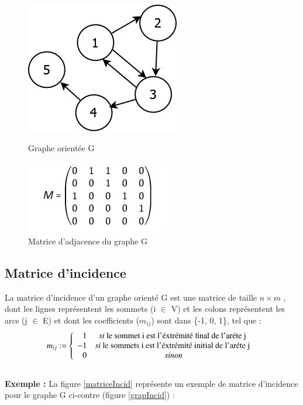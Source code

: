 \begin{figure}[!h]
	\begin{minipage}[c]{.46\linewidth}
	\begin{center}
		\includegraphics[height=100 pt, width=110 pt]{./ressources/image/graphAdjace.png} 
		\caption{Graphe orientée G}
		\label{grapAdjac}
	\end{center}
	\end{minipage} 
	\begin{minipage}[c]{.46\linewidth}
	\begin{center}
		\includegraphics[height=110 pt, width=140 pt]{./ressources/image/matriceAdjac.png} 
		\caption{Matrice d'adjacence du graphe G}
		\label{matriceAdjac}
	\end{center}
	\end{minipage} 
\end{figure}
			
			\subsection{Matrice d'incidence}
			La matrice d’incidence d’un graphe orienté  G est une matrice de taille $n \times m$ , dont les lignes représentent les sommets (i $\in$ V) et les colons représentent les arcs (j $\in$ E) et dont les coefficients (${m}_{ij}$) sont dans \{-1, 0, 1\}, tel que :
			\[{m}_{ij} :=
			\left\{
			\begin{array}{r c l}
			1 & si $ le sommet i est l'éxtrémité final de 					l'aréte j $ \\
			
			-1 & si $ le sommets i est l'éxtrémité initial de 				l'aréte j $ \\
			0 & sinon \\
			\end{array}
			\right.
			\]
			\\
\textbf{Exemple :} La figure \ref{matriceIncid} représente 					un exemple de matrice d'incidence pour le graphe G ci-contre 			(figure \ref{grapIncid}) :
			
